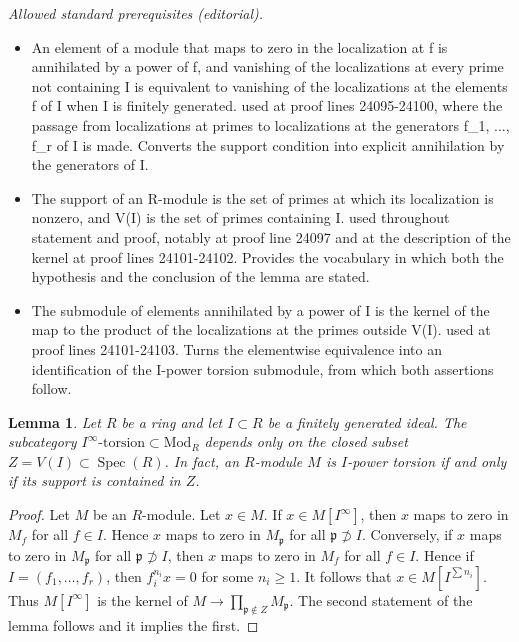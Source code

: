\documentclass[10pt,a4paper]{amsart}
\theoremstyle{plain}
\newtheorem{lemma}[subsection]{Lemma}
\theoremstyle{definition}
\theoremstyle{remark}
\numberwithin{equation}{subsection}
\def\Spec{\mathop{\mathrm{Spec}}}
\begin{document}
\noindent\textit{Allowed standard prerequisites (editorial).}\begin{itemize}
\item An element of a module that maps to zero in the localization at f is annihilated by a power of f, and vanishing of the localizations at every prime not containing I is equivalent to vanishing of the localizations at the elements f of I when I is finitely generated. used at proof lines 24095-24100, where the passage from localizations at primes to localizations at the generators f\_1, ..., f\_r of I is made. Converts the support condition into explicit annihilation by the generators of I.
\item The support of an R-module is the set of primes at which its localization is nonzero, and V(I) is the set of primes containing I. used throughout statement and proof, notably at proof line 24097 and at the description of the kernel at proof lines 24101-24102. Provides the vocabulary in which both the hypothesis and the conclusion of the lemma are stated.
\item The submodule of elements annihilated by a power of I is the kernel of the map to the product of the localizations at the primes outside V(I). used at proof lines 24101-24103. Turns the elementwise equivalence into an identification of the I-power torsion submodule, from which both assertions follow.
\end{itemize}\medskip
\begin{lemma}
\label{lemma-local-cohomology-closed}
Let $R$ be a ring and let $I \subset R$ be a finitely generated ideal.
The subcategory $I^\infty\text{-torsion} \subset \text{Mod}_R$
depends only on the closed subset $Z = V(I) \subset \Spec(R)$.
In fact, an $R$-module $M$ is $I$-power torsion if and only if its
support is contained in $Z$.
\end{lemma}

\begin{proof}
Let $M$ be an $R$-module. Let $x \in M$. If $x \in M[I^\infty]$, then $x$
maps to zero in $M_f$ for all $f \in I$. Hence $x$ maps to zero in
$M_\mathfrak p$ for all $\mathfrak p \not \supset I$. Conversely, if $x$
maps to zero in $M_\mathfrak p$ for all $\mathfrak p \not \supset I$,
then $x$ maps to zero in $M_f$ for all $f \in I$. Hence if
$I = (f_1, \ldots, f_r)$, then $f_i^{n_i}x = 0$ for some $n_i \geq 1$.
It follows that $x \in M[I^{\sum n_i}]$. Thus $M[I^\infty]$ is
the kernel of $M \to \prod_{\mathfrak p \not \in Z} M_\mathfrak p$.
The second statement of the lemma follows and it implies the first.
\end{proof}
\end{document}
